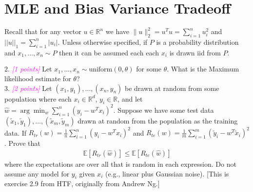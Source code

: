 \documentclass{article}
\newcommand{\1}{\mathbf{1}}
\def\E{\mathbb{E}}
\def\R{\mathbb{R}}
\newcommand{\grade}[1]{\small\textcolor{magenta}{\emph{[#1 points]}} \normalsize}
\begin{document}
\section{MLE and Bias Variance Tradeoff}
Recall that for any vector $u \in \R^n$ we have $\|u\|_2^2 = u^T u = \sum_{i=1}^n u_i^2$ and $||u||_1 = \sum_{i=1}^n |u_i|$. 
Unless otherwise specified, if $P$ is a probability distribution and $x_1,\dots,x_n \sim P$ then it can be assumed each each $x_i$ is drawn iid from $P$. 

2. \grade{1}  Let $x_1,\dots,x_n \sim \text{uniform}(0,\theta)$ for some $\theta$. What is the Maximum likelihood estimate for $\theta$?\\

3. \grade{2} Let $(x_1,y_1),\dots,(x_n,y_n)$ be drawn at random from some population where each $x_i \in \R^d$, $y_i \in \R$, and let $\widehat{w} = \arg\min_w \sum_{i=1}^n (y_i - w^T x_i)^2$.
Suppose we have some test data $(\widetilde{x}_1,\widetilde{y}_1),\dots,(\widetilde{x}_m,\widetilde{y}_m)$ drawn at random from the population as the training data. 
If $R_{tr}(w) = \frac{1}{n} \sum_{i=1}^n (y_i - w^T x_i)^2$ and $R_{te}(w) = \frac{1}{m} \sum_{i=1}^m (\widetilde{y}_i - w^T \widetilde{x}_i)^2$. Prove that 
\begin{align*}
\E[ R_{tr}(\widehat{w}) ] \leq \E[ R_{te}(\widehat{w}) ]
\end{align*}
where the expectations are over all that is random in each expression. Do not assume any model for $y_i$ given $x_i$ (e.g., linear plus Gaussian noise). [This is exercise 2.9 from HTF, originally from Andrew Ng.]\\
\end{document}

